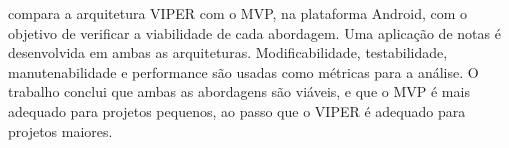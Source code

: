 compara a arquitetura VIPER com o MVP, na plataforma Android, com o objetivo de verificar a viabilidade de cada abordagem.
Uma aplicação de notas é desenvolvida em ambas as arquiteturas.
Modificabilidade, testabilidade, manutenabilidade e performance são usadas como métricas para a análise.
O trabalho conclui que ambas as abordagens são viáveis, e que o MVP é mais adequado para projetos pequenos, ao passo que o VIPER é adequado para projetos maiores.